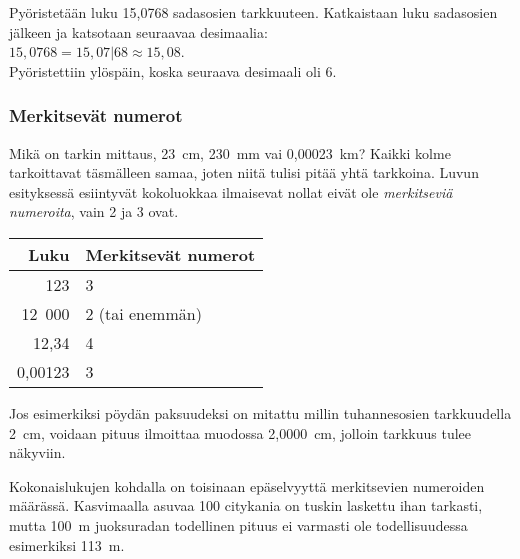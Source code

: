 \begin{esimerkki}
Pyöristetään luku 15,0768 sadasosien tarkkuuteen. Katkaistaan luku sadasosien jälkeen ja katsotaan seuraavaa desimaalia:\\
$15,0768 = 15,07|68 \approx 15,08$.\\
Pyöristettiin ylöspäin, koska seuraava desimaali oli 6.
\end{esimerkki}


\subsubsection*{Merkitsevät numerot}

Mikä on tarkin mittaus, 23~cm, 230~mm vai 0,00023~km? Kaikki kolme tarkoittavat täsmälleen samaa, joten niitä tulisi pitää
yhtä tarkkoina. Luvun esityksessä esiintyvät kokoluokkaa ilmaisevat nollat eivät ole \emph{merkitseviä numeroita}, vain 2 ja 3 ovat.


\begin{center}
\begin{tabular}{r|l}
Luku & Merkitsevät numerot \\
\hline
123 & 3 \\
12~000 & 2 (tai enemmän)\\
12,34 & 4 \\
0,00123 & 3
\end{tabular}
\end{center}

Jos esimerkiksi pöydän paksuudeksi on mitattu millin tuhannesosien tarkkuudella 2~cm, voidaan pituus ilmoittaa muodossa 2,0000~cm, jolloin tarkkuus tulee näkyviin.


Kokonaislukujen kohdalla on toisinaan epäselvyyttä merkitsevien numeroiden määrässä. Kasvimaalla asuvaa 100 citykania on tuskin laskettu ihan tarkasti, mutta 100~m juoksuradan todellinen pituus ei varmasti ole todellisuudessa esimerkiksi 113~m.

